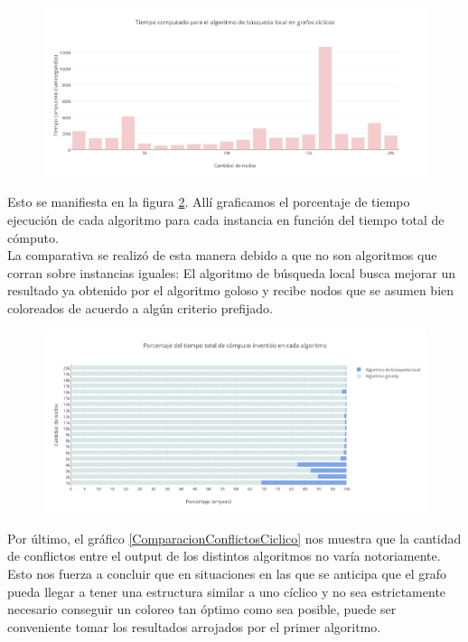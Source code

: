  \begin{figure}[H]
    \begin{center}
  	\includegraphics[width=18cm]{imagenes/Ej5/TiempoLocalCiclico.png}
 	\label{TiempoLocalCiclico}
    \end{center}
  \end{figure}

Esto se manifiesta en la figura \ref{ComparacionTiemposCiclico}. Allí graficamos el porcentaje de tiempo ejecución de cada algoritmo para cada instancia en función del tiempo total de cómputo.\\
La comparativa se realizó de esta manera debido a que no son algoritmos que corran sobre instancias iguales: El algoritmo de búsqueda local busca mejorar un resultado ya obtenido por el algoritmo goloso y recibe nodos que se asumen bien coloreados de acuerdo a algún criterio prefijado.

 \begin{figure}[H]
    \begin{center}
  	\includegraphics[width=18cm]{imagenes/Ej5/ComparacionTiemposCiclico.png}
 	\label{ComparacionTiemposCiclico}
    \end{center}
  \end{figure}

Por último, el gráfico \ref{ComparacionConflictosCiclico} nos muestra que la cantidad de conflictos entre el output de los distintos algoritmos no varía notoriamente. Esto nos fuerza a concluir que en situaciones en las que se anticipa que el grafo pueda llegar a tener una estructura similar a uno cíclico y no sea estrictamente necesario conseguir un coloreo tan óptimo como sea posible, puede ser conveniente tomar los resultados arrojados por el primer algoritmo.

